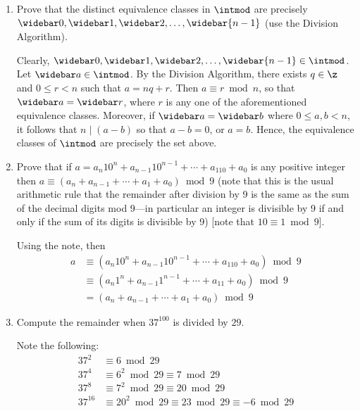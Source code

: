 \begin{enumerate}
\begin{sol}
    \end{sol}
    \item Prove that the distinct equivalence classes in $\intmod$ are precisely $\widebar 0, \widebar 1, \widebar 2, \ldots, \widebar{n - 1}$ (use the Division Algorithm).
    \begin{sol}
        Clearly, $\widebar 0, \widebar 1, \widebar 2, \ldots, \widebar{n - 1} \in \intmod$. Let $\widebar a \in \intmod$. By the Division Algorithm, there exists $q \in \z$ and $0 \leq r < n$ such that $a = nq + r$. Then $a \equiv r \bmod n$, so that $\widebar a = \widebar r$, where $r$ is any one of the aforementioned equivalence classes. Moreover, if $\widebar a = \widebar b$ where $0 \leq a, b < n$, it follows that $n \mid (a - b)$ so that $a - b = 0$, or $a = b$. Hence, the equivalence classes of $\intmod$ are precisely the set above.
    \end{sol}
    \item Prove that if $a = a_n10^n + a_{n - 1}10^{n - 1} + \cdots + a_110 + a_0$ is any positive integer then $a \equiv (a_n + a_{n - 1} + \cdots + a_1 + a_0) \bmod 9$ (note that this is the usual arithmetic rule that the remainder after division by 9 is the same as the sum of the decimal digits mod 9—in particular an integer is divisible by 9 if and only if the sum of its digits is divisible by 9) [note that $10 \equiv 1 \bmod 9$].
    \begin{sol}
        Using the note, then
        \begin{align*}
            a & \equiv (a_n10^n + a_{n - 1}10^{n - 1} + \cdots + a_110 + a_0) \bmod 9 \\
            & \equiv (a_n1^n + a_{n - 1}1^{n - 1} + \cdots + a_11 + a_0) \bmod 9 \\
            & = (a_n + a_{n - 1} + \cdots + a_1 + a_0) \bmod 9
        \end{align*}
    \end{sol}
    \item Compute the remainder when $37^{100}$ is divided by $29$.
    \begin{sol}
        Note the following:
        \begin{align*}
            37^2 & \equiv 6 \bmod 29 \\ 
            37^4 & \equiv 6^2 \bmod 29 \equiv 7 \bmod 29 \\
            37^8 & \equiv 7^2 \bmod 29 \equiv 20 \bmod 29 \\
            37^{16} & \equiv 20^2 \bmod 29 \equiv 23 \bmod 29 \equiv -6 \bmod 29 \\

\end{align*}
\end{sol}
\end{enumerate}
